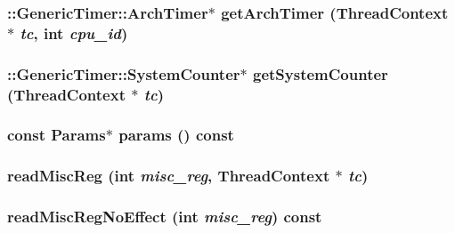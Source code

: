 \hypertarget{structArmISA_1_1ISA_a0b17cffd3a0fd5aa2339f4533db424d1}{
\subsubsection[{getArchTimer}]{\setlength{\rightskip}{0pt plus 5cm}::{\bf GenericTimer::ArchTimer}$\ast$ getArchTimer ({\bf ThreadContext} $\ast$ {\em tc}, \/  int {\em cpu\_\-id})}}
\label{structArmISA_1_1ISA_a0b17cffd3a0fd5aa2339f4533db424d1}
\hypertarget{structArmISA_1_1ISA_ae498e9dac91e31ef155c01f0f15113ff}{
\subsubsection[{getSystemCounter}]{\setlength{\rightskip}{0pt plus 5cm}::{\bf GenericTimer::SystemCounter}$\ast$ getSystemCounter ({\bf ThreadContext} $\ast$ {\em tc})}}
\label{structArmISA_1_1ISA_ae498e9dac91e31ef155c01f0f15113ff}
\hypertarget{structArmISA_1_1ISA_acd3c3feb78ae7a8f88fe0f110a718dff}{
\subsubsection[{params}]{\setlength{\rightskip}{0pt plus 5cm}const {\bf Params}$\ast$ params () const}}
\label{structArmISA_1_1ISA_acd3c3feb78ae7a8f88fe0f110a718dff}
\hypertarget{structArmISA_1_1ISA_a5e47db3953e6f623b58fee4f22a406bd}{
\subsubsection[{readMiscReg}]{ readMiscReg (int {\em misc\_\-reg}, \/  {\bf ThreadContext} $\ast$ {\em tc})}}
\label{structArmISA_1_1ISA_a5e47db3953e6f623b58fee4f22a406bd}
\hypertarget{structArmISA_1_1ISA_a17649252f355bfda86ea00dd728d8c02}{
\subsubsection[{readMiscRegNoEffect}]{ readMiscRegNoEffect (int {\em misc\_\-reg}) const}}
